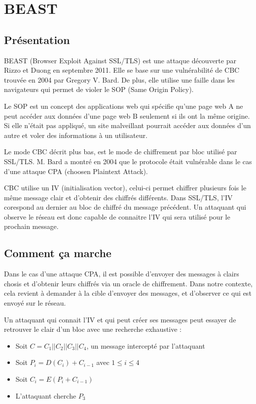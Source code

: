 \chapter{BEAST}
\label{chapter:Beast}

\section{Présentation}
\label{sec:pBeast}

BEAST (Browser Exploit Against SSL/TLS) est une attaque  découverte par Rizzo et Duong en septembre 2011.
Elle se base sur une vulnérabilité de CBC trouvée en 2004 par Gregory V. Bard. De plus, elle utilise une faille dans les
navigateurs qui permet de violer le SOP (Same Origin Policy).

Le SOP est un concept des applications web qui spécifie qu'une page web A ne peut accéder aux données d'une page web
B seulement si ils ont la même origine. Si elle n'était pas appliqué, un site malveillant pourrait accéder aux
données d'un autre et voler des informations à un utilisateur.

Le mode CBC décrit plus bas\up{\ref{fig:cbc}}, est le mode de chiffrement par bloc utilisé par SSL/TLS. 
M. Bard a montré en 2004 que le protocole était vulnérable dans le cas d'une attaque CPA (choosen Plaintext Attack).

CBC utilise un IV (initialisation vector), celui-ci permet chiffrer plusieurs fois le même message clair
et d'obtenir des chiffrés différents. Dans SSL/TLS, l'IV corespond au dernier au bloc de chiffré du message précédent.
Un attaquant qui observe le réseau est donc capable de connaitre l'IV qui sera utilisé pour le prochain message.

\section{Comment ça marche}
\label{sec:ccmBeast}

Dans le cas d'une attaque CPA, il est possible d'envoyer des messages à clairs chosis et d'obtenir leurs chiffrés
via un oracle de chiffrement. Dans notre contexte, cela revient à demander à la cible d'envoyer des messages, et
d'observer ce qui est envoyé sur le réseau.

Un attaquant qui connait l'IV et qui peut créer ses messages peut essayer de retrouver le clair d'un bloc avec une 
recherche exhaustive :

\begin{itemize}
\item Soit $C = C_1 || C_2 || C_3 || C_4$, un message intercepté par l'attaquant
\item Soit $P_i = D(C_i) + C_{i-1}$ avec $1 \leq i \leq 4$ 
\item Soit $C_i = E(P_i + C_{i-1}) $
\item L'attaquant cherche $P_3$
\end{itemize}


